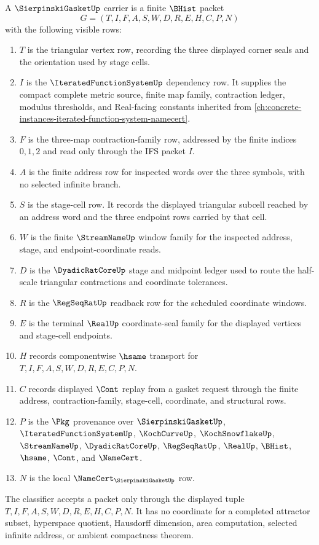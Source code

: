 \begin{definition}
\label{def:sierpinski-gasket-carrier}
A $\SierpinskiGasketUp$ carrier is a finite $\BHist$ packet
$$
G=(T,I,F,A,S,W,D,R,E,H,C,P,N)
$$
with the following visible rows:
\begin{enumerate}
\item $T$ is the triangular vertex row, recording the three displayed corner seals and the orientation used by stage cells.
\item $I$ is the $\IteratedFunctionSystemUp$ dependency row. It supplies the compact complete metric source, finite map family, contraction ledger, modulus thresholds, and Real-facing constants inherited from \autoref{ch:concrete-instances-iterated-function-system-namecert}.
\item $F$ is the three-map contraction-family row, addressed by the finite indices $0,1,2$ and read only through the IFS packet $I$.
\item $A$ is the finite address row for inspected words over the three symbols, with no selected infinite branch.
\item $S$ is the stage-cell row. It records the displayed triangular subcell reached by an address word and the three endpoint rows carried by that cell.
\item $W$ is the finite $\StreamNameUp$ window family for the inspected address, stage, and endpoint-coordinate reads.
\item $D$ is the $\DyadicRatCoreUp$ stage and midpoint ledger used to route the half-scale triangular contractions and coordinate tolerances.
\item $R$ is the $\RegSeqRatUp$ readback row for the scheduled coordinate windows.
\item $E$ is the terminal $\RealUp$ coordinate-seal family for the displayed vertices and stage-cell endpoints.
\item $H$ records componentwise $\hsame$ transport for $T,I,F,A,S,W,D,R,E,C,P,N$.
\item $C$ records displayed $\Cont$ replay from a gasket request through the finite address, contraction-family, stage-cell, coordinate, and structural rows.
\item $P$ is the $\Pkg$ provenance over $\SierpinskiGasketUp$, $\IteratedFunctionSystemUp$, $\KochCurveUp$, $\KochSnowflakeUp$, $\StreamNameUp$, $\DyadicRatCoreUp$, $\RegSeqRatUp$, $\RealUp$, $\BHist$, $\hsame$, $\Cont$, and $\NameCert$.
\item $N$ is the local $\NameCert_{\SierpinskiGasketUp}$ row.
\end{enumerate}
The classifier accepts a packet only through the displayed tuple $T,I,F,A,S,W,D,R,E,H,C,P,N$. It has no coordinate for a completed attractor subset, hyperspace quotient, Hausdorff dimension, area computation, selected infinite address, or ambient compactness theorem.
\end{definition}

